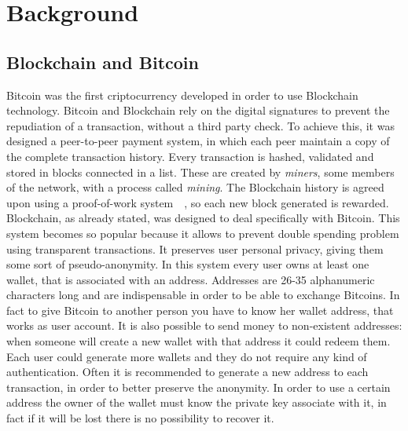 \section{Background}
\subsection{Blockchain and Bitcoin}
Bitcoin was the first criptocurrency developed in order to use Blockchain
technology. Bitcoin and Blockchain rely on the digital signatures
to prevent the repudiation of a transaction, without a third party check.
To achieve this, it was designed a peer-to-peer payment system, in which each
peer maintain a copy of the complete transaction history. Every transaction is
hashed, validated and stored in blocks connected in a list. These are created
by \textit{miners}, some members of the network, with a process called
\textit{mining}. The Blockchain history is agreed upon using a proof-of-work
system~\cite{pricing}~\cite{hashcash}, so each new block generated is rewarded.
Blockchain, as already stated, was designed to deal specifically with
Bitcoin. This system becomes so popular because it allows
to prevent double spending problem using transparent transactions. It
preserves user personal privacy, giving them some sort of pseudo-anonymity.
In this system every user owns at least one wallet, that is associated with an
address. Addresses are 26-35 alphanumeric characters long and are indispensable
in order to be able to exchange Bitcoins. In fact to give Bitcoin to another
person you have to know her wallet address, that works as user account. It is
also possible to send money to non-existent addresses: when someone will create
a new wallet with that address it could redeem them. Each user could generate
more wallets and they do not require any kind of authentication. Often it is
recommended to generate a new address to each transaction, in order to better
preserve the anonymity\cite{satoshi}. In order to use a certain address the
owner of the wallet must know the private key associate with it, in fact if it
will be lost there is no possibility to recover it. 


